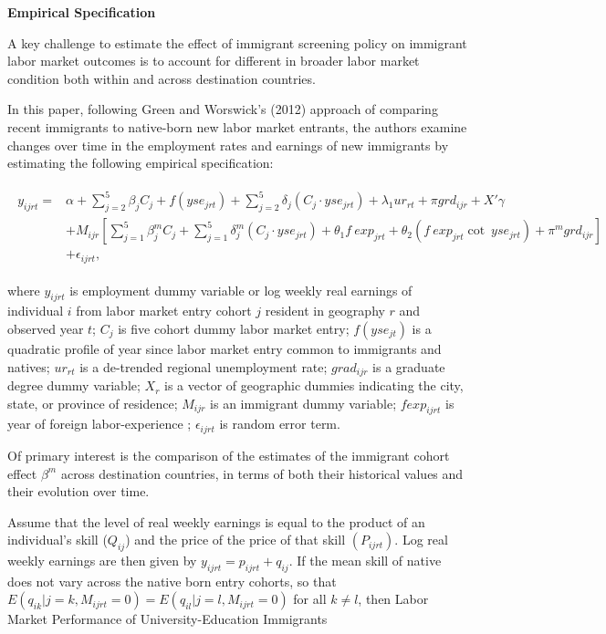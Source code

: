 \documentclass[../root]{subfiles}
\begin{document}
    
    {\bf Empirical Specification}
    
    A key challenge to estimate the effect of immigrant screening policy  on immigrant labor market outcomes is to account for different in broader labor market condition both within and across destination countries. 
    
    In this paper, following Green and Worswick’s (2012) approach of comparing recent immigrants to native-born new labor market entrants, the authors examine changes over time in the employment rates and earnings of new immigrants by estimating the following empirical specification:
    
    \begin{align}
    \begin{split}
         y_{ijrt} = &\alpha + \sum^{5}_{j=2}\beta_j C_j + f(yse_{jrt}) + \sum^{5}_{j=2}\delta_j (C_j\cdot yse_{jrt}) +\lambda_1 ur_{rt} + \pi grd_{ijr} +  X' \gamma  \\
        &+M_{ijr} \left[\sum^{5}_{j=1}\beta^m_j C_j +  \sum^{5}_{j=1} \delta^m_j(C_j\cdot yse_{jrt}) +\theta_1 f \ exp_{jrt} +\theta_2( f \ exp_{jrt}\cot \ yse_{jrt} )+\pi^m grd_{ijr}  \right] \\
        &+ \epsilon_{ijrt},
    \end{split}
    \end{align}
    
    where $y_{ijrt}$ is employment dummy variable or log weekly real earnings of individual $i$ from labor market entry cohort $j$ resident in geography $r$ and observed year $t$; $C_j$ is five cohort dummy labor market entry; $f(yse_{jt})$ is a quadratic profile of year since labor market entry common to immigrants and natives; $ur_{rt}$ is a de-trended regional unemployment rate; $grad_{ijr}$ is a graduate degree dummy variable; $X_{r}$ is a vector of geographic dummies indicating the city, state, or province of residence; $M_{ijr}$ is an immigrant dummy variable; $fexp_{ijrt}$ is year of foreign labor-experience ; $\epsilon_{ijrt}$ is random error term. 
    
    
    Of primary interest is the comparison of the estimates of the immigrant cohort effect $\beta^m$ across destination countries, in terms of both their historical values and their evolution over time.
    
    Assume that the level of real weekly earnings is equal to the product of an individual's skill ($Q_{ij}$) and the price of the price of that skill $(P_{ijrt})$. Log real weekly earnings are then given by $y_{ijrt }= p_{ijrt} + q_{ij}$. If the mean skill of native does not vary across the native born entry cohorts, so that $E(q_{ik}|j=k, M_{ijrt}=0)=E(q_{il}|j=l, M_{ijrt}=0)$ for all $k\neq l$, then Labor Market Performance of University-Education Immigrants
    
\end{document}
